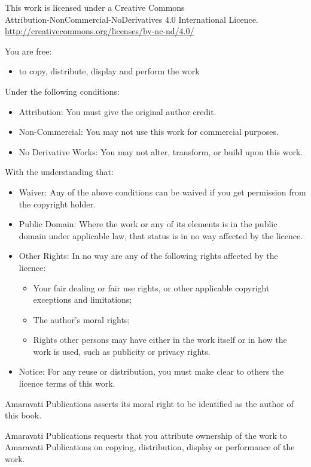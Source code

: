 
\thispagestyle{plain}

{%
\ifaivedition
\fontsize{12}{15}\selectfont
\else
\small
\fi
\setlength{\parindent}{0pt}%
\raggedright\label{copyright-details}
\setlength{\parskip}{10pt}
{\centering

{\Huge\ccbyncnd}

This work is licensed under a Creative Commons\\
Attribution-NonCommercial-NoDerivatives 4.0 International Licence.\\
\href{http://creativecommons.org/licenses/by-nc-nd/4.0/}{http://creativecommons.org/licenses/by-nc-nd/4.0/}

}

You are free:

\begin{itemize}
\item to copy, distribute, display and perform the work
\end{itemize}

Under the following conditions:

\begin{itemize}
\item Attribution: You must give the original author credit.
\item Non-Commercial: You may not use this work for commercial purposes.
\item No Derivative Works: You may not alter, transform, or build upon this work.
\end{itemize}

With the understanding that:

\begin{itemize}
\item Waiver: Any of the above conditions can be waived if you get permission from the copyright holder.
\item Public Domain: Where the work or any of its elements is in the public domain under applicable law, that status is in no way affected by the licence.
\item Other Rights: In no way are any of the following rights affected by the licence:
\begin{itemize}
\item Your fair dealing or fair use rights, or other applicable copyright exceptions and limitations;
\item The author's moral rights;
\item Rights other persons may have either in the work itself or in how the work is used, such as publicity or privacy rights.
\end{itemize}
\item Notice: For any reuse or distribution, you must make clear to others the licence terms of this work.
\end{itemize}

Amaravati Publications asserts its moral right to be identified as the
author of this book.

Amaravati Publications requests that you attribute ownership of the work
to Amaravati Publications on copying, distribution, display or
performance of the work.

}

